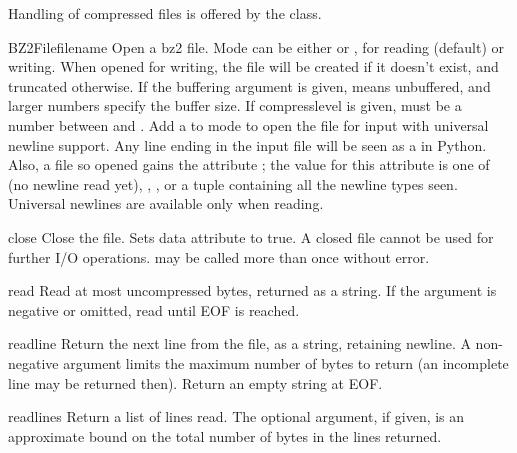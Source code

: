 Handling of compressed files is offered by the  class.

\begin{classdesc}{BZ2File}{filename }
Open a bz2 file. Mode can be either  or , for reading
(default) or writing. When opened for writing, the file will be created if
it doesn't exist, and truncated otherwise. If the buffering argument is given,
 means unbuffered, and larger numbers specify the buffer size. If
compresslevel is given, must be a number between  and .
Add a  to mode to open the file for input with universal newline
support. Any line ending in the input file will be seen as a
in Python.  Also, a file so opened gains the attribute ;
the value for this attribute is one of  (no newline read yet),
, ,
 or a tuple containing all the
newline types seen. Universal newlines are available only when reading.
\end{classdesc}

\begin{methoddesc}[BZ2File]{close}{}
Close the file. Sets data attribute  to true. A closed file
cannot be used for further I/O operations.  may be called
more than once without error.
\end{methoddesc}

\begin{methoddesc}[BZ2File]{read}{}
Read at most  uncompressed bytes, returned as a string. If the
 argument is negative or omitted, read until EOF is reached.
\end{methoddesc}

\begin{methoddesc}[BZ2File]{readline}{}
Return the next line from the file, as a string, retaining newline.
A non-negative  argument limits the maximum number of bytes to
return (an incomplete line may be returned then). Return an empty
string at EOF.
\end{methoddesc}

\begin{methoddesc}[BZ2File]{readlines}{}
Return a list of lines read. The optional  argument, if given,
is an approximate bound on the total number of bytes in the lines returned.
\end{methoddesc}

